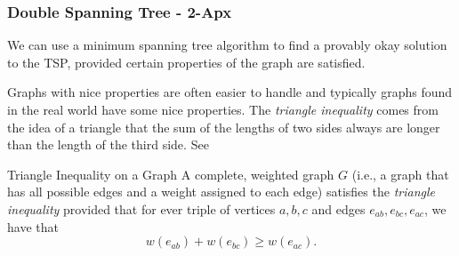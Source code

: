 \subsubsection{Double Spanning Tree - 2-Apx}
We can use a minimum spanning tree algorithm to find a provably okay solution to the TSP, provided certain properties of the graph are satisfied.  

Graphs with nice properties are often easier to handle and typically graphs found in the real world have some nice properties. The \emph{triangle inequality} comes from the idea of a triangle that the sum of the lengths of two sides always are longer than the length of the third side. See 


\begin{definition}{Triangle Inequality on a Graph}{}
A complete, weighted graph $G$ (i.e., a graph that has all possible edges and a weight assigned to each edge) satisfies the \emph{triangle inequality} provided that for ever triple of vertices $a,b,c$ and edges $e_{ab}, e_{bc}, e_{ac}$, we have that 
\[
w(e_{ab}) + w(e_{bc}) \geq w(e_{ac}).
\]
\end{definition}



